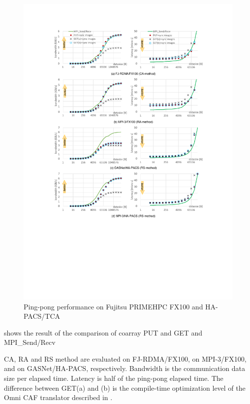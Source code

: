 \begin{figure}
  \begin{center}
    \mbox{\includegraphics[trim=30mm 80mm 30mm 25mm, scale=0.8, clip]{graphs/8graphs-7.pdf}}
    \caption{Ping-pong performance on Fujitsu PRIMEHPC FX100 and HA-PACS/TCA}\label{fig:8graphs}
  \end{center}
\end{figure}

 shows the result of the comparison of coarray PUT and GET and MPI\_Send/Recv 


CA, RA and RS method are evaluated on FJ-RDMA/FX100, on MPI-3/FX100, and on GASNet/HA-PACS,
respectively.
Bandwidth is the communication data size per elapsed time. 
Latency is half of the ping-pong elapsed time.
The difference between GET(a) and (b) is the compile-time optimization level of the 
Omni CAF translator described in .


